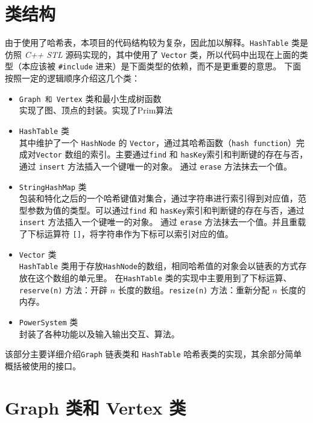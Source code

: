 
\chapter{类结构}
由于使用了哈希表，本项目的代码结构较为复杂，因此加以解释。\lstinline{HashTable} 类是仿照 \emph{C++ STL} 源码实现的，其中使用了%
\lstinline{Vector} 类，所以代码中出现在上面的类型（本应该被 \lstinline{#include} 进来）是下面类型的依赖，而不是更重要的意思。%
下面按照一定的逻辑顺序介绍这几个类：

\begin{itemize}
    \item \lstinline{Graph 和 Vertex} 类和最小生成树函数\\
    实现了图、顶点的封装。实现了Prim算法
    \item \lstinline{HashTable} 类\\
    其中维护了一个 \lstinline{HashNode} 的 \lstinline{Vector}，通过其哈希函数（\lstinline{hash function}）完成对\lstinline{Vector}%
    数组的索引。主要通过\lstinline{find} 和 \lstinline{hasKey}索引和判断键的存在与否，通过 \lstinline{insert} 方法插入一个键唯一的对象。%
    通过 \lstinline{erase} 方法抹去一个值。
    \item \lstinline{StringHashMap} 类\\
    包装和特化之后的一个哈希键值对集合，通过字符串进行索引得到对应值，范型参数为值的类型。可以通过\lstinline{find} 和 %
    \lstinline{hasKey}索引和判断键的存在与否，通过 \lstinline{insert} 方法插入一个键唯一的对象。%
    通过 \lstinline{erase} 方法抹去一个值。并且重载了下标运算符 \lstinline{[]}，将字符串作为下标可以索引对应的值。
    \item \lstinline{Vector} 类\\
    \lstinline{HashTable} 类用于存放\lstinline{HashNode}的数组，相同哈希值的对象会以链表的方式存放在这个数组的单元里。%
    在\lstinline{HashTable} 类的实现中主要用到了下标运算、\lstinline{reserve(n)} 方法：开辟 $n$ 长度的数组。\lstinline{resize(n)}%
    方法：重新分配 $n$ 长度的内存。
    \item \lstinline{PowerSystem} 类\\
    封装了各种功能以及输入输出交互、算法。
\end{itemize}

该部分主要详细介绍\lstinline{Graph} 链表类和 \lstinline{HashTable} 哈希表类的实现，其余部分简单概括被使用的接口。


\chapter{Graph 类和 Vertex 类}


